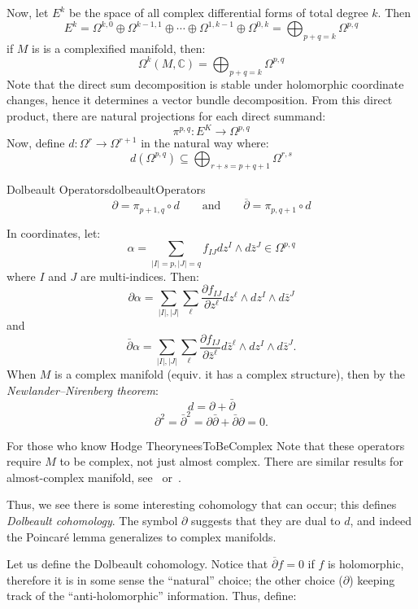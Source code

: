 \documentclass{book}
\newcommand{\C}{{\mathbb{C}}}
\newcommand{\sse}{\subseteq}
\begin{document}
Now, let $E^k$ be the space of all complex differential forms of total degree $k$. Then
\[
  E^k = \Omega^{k,0} \oplus \Omega^{k-1, 1}\oplus \cdots \oplus \Omega^{1, k-1}\oplus \Omega^{0,k}
  = \bigoplus_{p+q=k} \Omega^{p,q}
\]
if $M$ is is a complexified manifold, then:
\[
  \Omega^k(M, \C) = \bigoplus_{p+q=k} \Omega^{p,q}
\]
Note that the direct sum decomposition is stable under holomorphic coordinate changes, hence it determines
a vector bundle decomposition. From this direct product, there are natural projections for each direct summand:
\[
  \pi^{p,q}: E^K \to \Omega^{p,q}
\]
Now, define $d: \Omega^r \to \Omega^{r+1}$ in the natural way where:
\[
  d(\Omega^{p,q}) \sse \bigoplus_{r+s=p+q+1} \Omega^{r,s}
\]
\begin{defn}{Dolbeault Operators}{dolbeaultOperators}
  \[
    \partial = \pi_{p+1, q}\circ d \qquad \text{and} \qquad \overline{\partial} = \pi_{p, q+1}\circ d
  \]
\end{defn}
In coordinates, let:
\[
    \alpha = \sum_{|I|=p,|J|=q} f_{IJ} dz^I \wedge d\bar{z}^J \in \Omega^{p,q}
\]
where $I$ and $J$ are multi-indices. Then:
\[
    \partial\alpha = \sum_{|I|,|J|} \sum_\ell \frac{\partial f_{IJ}}{\partial z^\ell} dz^\ell \wedge dz^I \wedge d\bar{z}^J
\]
and
\[
    \bar{\partial}\alpha = \sum_{|I|,|J|} \sum_\ell \frac{\partial f_{IJ}}{\partial\bar{z}^\ell} d\bar{z}^\ell \wedge dz^I \wedge d\bar{z}^J.
\]
When $M$ is a complex manifold (equiv. it has a complex structure), then by the \emph{Newlander–Nirenberg
theorem}:
\[
    d = \partial + \bar{\partial}
\]
\[
    \partial^2 = \bar{\partial}^2 = \partial\bar{\partial} + \bar{\partial}\partial = 0.
\]
\begin{titledBox}{For those who know Hodge Theory}{neesToBeComplex}
  Note that these operators require $M$ to be complex, not just almost complex. There are similar results for
  almost-complex manifold, see~\cite{HodgeTheory2014} or~\cite{hodge1951kahler}.
\end{titledBox}
Thus, we see there is some interesting cohomology that can occur; this defines \emph{Dolbeault cohomology}.
The symbol $\partial$ suggests that they are dual to $d$, and indeed the Poincar\'e lemma generalizes to
complex manifolds.

Let us define the Dolbeault cohomology. Notice that $\overline{\partial}f = 0$ if $f$ is holomorphic,
therefore it is in some sense the ``natural'' choice; the other choice ($\partial$) keeping track of the
``anti-holomorphic'' information. Thus, define:
\end{document}
